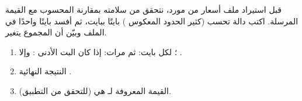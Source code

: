 \begin{statement}
قبل استيراد ملف أسعار من مورد، نتحقق من سلامته بمقارنة \textbf{} المحسوب مع القيمة المرسلة. اكتب دالة  تحسب  (كثير الحدود المعكوس ) بايتًا ببايت، ثم أفسد بايتًا واحدًا في الملف وبيّن أن المجموع يتغير.
\end{statement}
\begin{stepsbox}\begin{enumerate}
\item {}؛ لكل بايت:  ثم  مرات: إذا كان البت الأدنى :  وإلا .
\item النتيجة النهائية .
\item القيمة المعروفة لـ  هي  (للتحقق من التطبيق).
\end{enumerate}\end{stepsbox}
